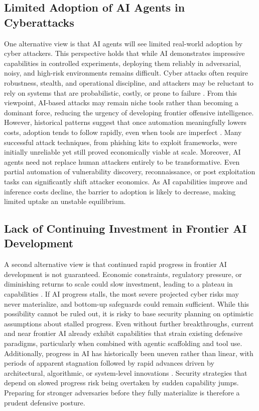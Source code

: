 \documentclass{article}
\theoremstyle{plain}
\theoremstyle{definition}
\theoremstyle{remark}
\begin{document}
\subsection{Limited Adoption of AI Agents in Cyberattacks}

One alternative view is that AI agents will see limited real-world adoption by cyber attackers. This perspective holds that while AI demonstrates impressive capabilities in controlled experiments, deploying them reliably in adversarial, noisy, and high-risk environments remains difficult. Cyber attacks often require robustness, stealth, and operational discipline, and attackers may be reluctant to rely on systems that are probabilistic, costly, or prone to failure \citep{rid2015attributing}. From this viewpoint, AI-based attacks may remain niche tools rather than becoming a dominant force, reducing the urgency of developing frontier offensive intelligence.
However, historical patterns suggest that once automation meaningfully lowers costs, adoption tends to follow rapidly, even when tools are imperfect \citep{kaloudi2020ai}. Many successful attack techniques, from phishing kits to exploit frameworks, were initially unreliable yet still proved economically viable at scale. Moreover, AI agents need not replace human attackers entirely to be transformative. Even partial automation of vulnerability discovery, reconnaissance, or post exploitation tasks can significantly shift attacker economics. As AI capabilities improve and inference costs decline, the barrier to adoption is likely to decrease, making limited uptake an unstable equilibrium.

\subsection{Lack of Continuing Investment in Frontier AI Development}

A second alternative view is that continued rapid progress in frontier AI development is not guaranteed. Economic constraints, regulatory pressure, or diminishing returns to scale could slow investment, leading to a plateau in capabilities \citep{floridi2024ai}. If AI progress stalls, the most severe projected cyber risks may never materialize, and bottom-up safeguards could remain sufficient.
While this possibility cannot be ruled out, it is risky to base security planning on optimistic assumptions about stalled progress. Even without further breakthroughs, current and near frontier AI already exhibit capabilities that strain existing defensive paradigms, particularly when combined with agentic scaffolding and tool use. Additionally, progress in AI has historically been uneven rather than linear, with periods of apparent stagnation followed by rapid advances driven by architectural, algorithmic, or system-level innovations \citep{guo2025deepseek}. Security strategies that depend on slowed progress risk being overtaken by sudden capability jumps. Preparing for stronger adversaries before they fully materialize is therefore a prudent defensive posture.
\end{document}
